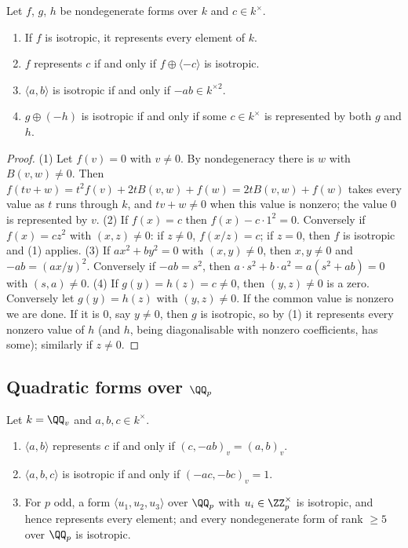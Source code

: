 \begin{lemma}\label{p-adic-numbers:lemma-isotropic}
Let $f$, $g$, $h$ be nondegenerate forms over $k$ and $c \in k^\times$.
\begin{enumerate}
\item If $f$ is isotropic, it represents every element of $k$.
\item $f$ represents $c$ if and only if $f \oplus \langle -c\rangle$ is isotropic.
\item $\langle a, b\rangle$ is isotropic if and only if $-ab \in k^{\times2}$.
\item $g \oplus (-h)$ is isotropic if and only if some $c \in k^\times$ is represented by both $g$ and $h$.
\end{enumerate}
\end{lemma}

\begin{proof}
(1) Let $f(v) = 0$ with $v \neq 0$. By nondegeneracy there is $w$ with $B(v, w) \neq 0$. Then $f(tv + w) = t^2f(v) + 2tB(v, w) + f(w) = 2tB(v, w) + f(w)$ takes every value as $t$ runs through $k$, and
$tv + w \neq 0$ when this value is nonzero; the value $0$ is represented by $v$.
(2) If $f(x) = c$ then $f(x) - c \cdot 1^2 = 0$. Conversely if $f(x) = cz^2$ with $(x, z) \neq 0$: if $z \neq 0$, $f(x/z) = c$; if $z = 0$, then $f$ is isotropic and (1) applies.
(3) If $ax^2 + by^2 = 0$ with $(x, y) \neq 0$, then $x, y \neq 0$ and $-ab = (ax/y)^2$. Conversely if $-ab = s^2$, then $a \cdot s^2 + b \cdot a^2 = a(s^2 + ab) = 0$ with $(s, a) \neq 0$.
(4) If $g(y) = h(z) = c \neq 0$, then $(y, z) \neq 0$ is a zero. Conversely let $g(y) = h(z)$ with $(y, z) \neq 0$. If the common value is nonzero we are done. If it is $0$, say $y \neq 0$, then $g$ is isotropic, so by
(1) it represents every nonzero value of $h$ (and $h$, being diagonalisable with nonzero coefficients, has some); similarly if $z \neq 0$.
\end{proof}

\subsection{Quadratic forms over $\QQ_p$}\label{p-adic-numbers:subsection-local-forms}

\begin{proposition}\label{p-adic-numbers:proposition-local-forms}
Let $k = \QQ_v$ and $a, b, c \in k^\times$.
\begin{enumerate}
\item $\langle a, b\rangle$ represents $c$ if and only if $(c, -ab)_v = (a, b)_v$.
\item $\langle a, b, c\rangle$ is isotropic if and only if $(-ac, -bc)_v = 1$.
\item For $p$ odd, a form $\langle u_1, u_2, u_3\rangle$ over $\QQ_p$ with $u_i \in \ZZ_p^\times$ is isotropic, and hence represents every element; and every nondegenerate form of rank $\geq 5$ over $\QQ_p$ is
isotropic.
\end{enumerate}
\end{proposition}


